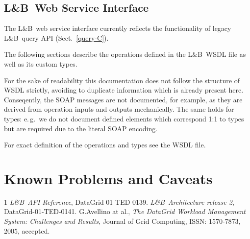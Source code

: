 \documentclass{egee}
\def\LB{L\&B}
\def\eg{e.\,g.}
\begin{document}
\subsection{\LB\ Web Service Interface}

The \LB\ web service interface currently reflects the functionality of legacy
\LB\ query API (Sect.~\ref{query-C}). 

The following sections describe the operations defined in the \LB\ WSDL
file as well as its custom types.

For the sake of readability this documentation does not follow the structure
of WSDL strictly, avoiding to duplicate information which is already present
here.
Conseqently, the SOAP messages are not documented, for example, as they
are derived from operation inputs and outputs mechanically.
The same holds for types: \eg\ we do not document defined elements 
which correspond 1:1 to types but are required due to the literal SOAP
encoding.

For exact definition of the operations and types see the WSDL file.


{
\def\chapter#1{}
\def\section#1{\subsubsection{#1}}
\def\subsection#1{\par\textbf{#1}\par}

\let\odesc=\description
\let\oedesc=\enddescription
\renewenvironment{description}{\odesc\itemindent=1em
\listparindent=2em
}{\oedesc}

\let\null=\relax
%
}


\newpage
\section{Known Problems and Caveats}



\begin{thebibliography}1
\emph{\LB\ API Reference}, DataGrid-01-TED-0139.
\emph{\LB\ Architecture release 2}, DataGrid-01-TED-0141.
 G.Avellino at al., \emph{The DataGrid Workload Management System: Challenges and Results}, Journal of Grid Computing, ISSN: 1570-7873, 2005, accepted.
\end{thebibliography}
\end{document}
